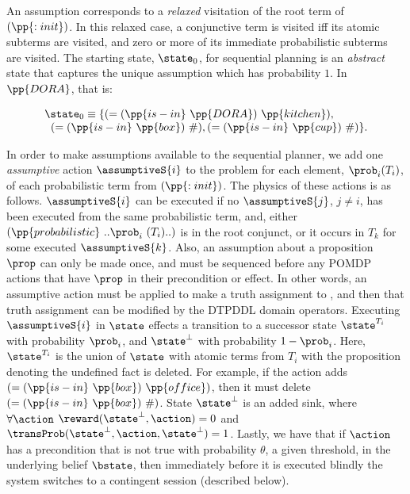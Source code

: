 \noindent An assumption corresponds to a {\em
relaxed} visitation of the root term of $(\pp{:init})$. In this
relaxed case, a conjunctive term is visited iff its atomic subterms
are visited, and zero or more of its immediate probabilistic subterms
are visited. The starting state, $\state_0$, for sequential planning
is an {\em abstract} state that captures the unique assumption which
has probability $1$. In $\pp{DORA}$, that is:

\[
\begin{array}{l}
\state_0 \equiv \{(=(\pp{is-in}~\pp{DORA})~\pp{kitchen}),\\
\;\;(=(\pp{is-in}~\pp{box})~\#), (=(\pp{is-in}~\pp{cup})~\#)\}.
\end{array}
\]

In order to make assumptions available to the sequential planner, we
add one {\em assumptive} action $\assumptiveS{i}$ to the problem for
each element, $\prob_i (T_i)$, of each probabilistic term from
$(\pp{:init})$. The physics of these actions is as
follows. $\assumptiveS{i}$ can be executed if no $\assumptiveS{j}$,
$j \neq i$, has been executed from the same probabilistic term, and,
either $(\pp{probabilistic}~..\prob_i~(T_i)..)$ is in the root
conjunct, or it occurs in $T_k$ for some executed
$\assumptiveS{k}$. Also, an assumption about a proposition
$\prop$ can only be made once, and must be sequenced before any POMDP
actions that have $\prop$ in their precondition or effect.
In other words, an assumptive action
must be applied to make a truth assignment to \prop, and then that
truth assignment can be modified by the DTPDDL domain operators.
Executing $\assumptiveS{i}$ in $\state$ effects a transition to a
successor state $\state^{T_i}$ with probability $\prob_i$, and
$\state^\bot$ with probability $1 - \prob_i$. Here, $\state^{T_i}$ is
the union of $\state$ with atomic terms from $T_i$ with the
proposition denoting the undefined fact is deleted. For example, if
the action adds $(=(\pp{is-in}~\pp{box})~\pp{office})$, then it must
delete $(=(\pp{is-in}~\pp{box})~\#)$. State $\state^\bot$ is an added
sink, where $\forall\action$ $\reward(\state^\bot, \action) = 0$ and
$\transProb(\state^\bot, \action, \state^\bot) = 1$.
Lastly, we have that if $\action$ has a precondition that is not true
with probability $\theta$, a given threshold, in the underlying belief
$\bstate$, then immediately before it is executed blindly the system
switches to a contingent session (described below).


